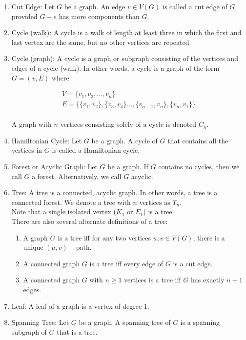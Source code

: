 \documentclass{article}
\begin{document}
\begin{enumerate}
		\item Cut Edge: Let $G$ be a graph.
		An edge $v\in V(G)$ is called a cut edge of $G$ provided $G-e$ has more components than $G$.
		
		\item Cycle (walk): A cycle is a walk of length at least three in which the first and last vertex are the same, but no other vertices are repeated.
		
		\item Cycle (graph): A cycle is a graph or subgraph consisting of the vertices and edges of a cycle (walk).
		In other words, a cycle is a graph of the form $G=(v,E)$ where
		
		\begin{gather*}
			V=\{v_1,v_2,\dots,v_n\} \:\: \\
			E=\{\{v_1, v_2\}, \{v_3, v_4\}\dots,\{v_{n-1}, v_n\},\{v_n, v_1\}\}\\
		\end{gather*}
		
		A graph with $n$ vertices consisting solely of a cycle is denoted $C_n$.
		
		\item Hamiltonian Cycle: Let $G$ be a graph.
		A cycle of $G$ that contains all the vertices in $G$ is called a Hamiltonian cycle.
		
		\item Forest or Acyclic Graph: Let $G$ be a graph.
		If $G$ contains no cycles, then we call $G$ a forest.
		Alternatively, we call $G$ acyclic.
		
		\item Tree: A tree is a connected, acyclic graph.
		In other words, a tree is a connected forest.
		We denote a tree with $n$ vertices as $T_n$.\\
		
		Note that a single isolated vertex ($K_1$ or $E_1$) is a tree.\\
		
		There are also several alternate definitions of a tree:
		
		\begin{enumerate}
			\item A graph $G$ is a tree iff for any two vertices $u,v\in V(G)$, there is a unique $(u,v)-$path.
			\item A connected graph $G$ is a tree iff every edge of $G$ is a cut edge.
			\item A connected graph $G$ with $n\geq 1$ vertices is a tree iff $G$ has exactly $n-1$ edges.
		\end{enumerate}
		
		\item Leaf: A leaf of a graph is a vertex of degree 1.
		
		\item Spanning Tree: Let $G$ be a graph.
		A spanning tree of $G$ is a spanning subgraph of $G$ that is a tree.
	
	\end{enumerate}
\end{document}
